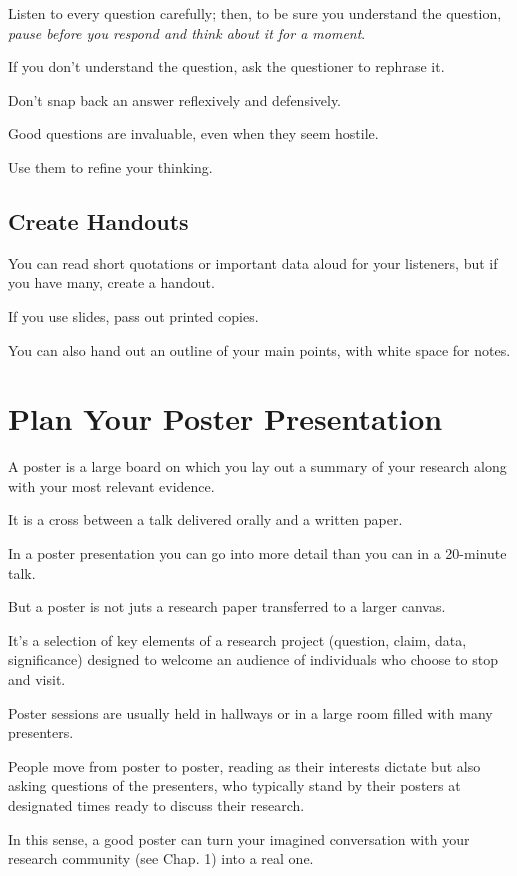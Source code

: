 \documentclass[oneside]{book}
\numberwithin{equation}{section}
\begin{document}
%
Listen to every question carefully; then, to be sure you understand the question, \textit{pause before you respond and think about it for a moment}.

If you don't understand the question, ask the questioner to rephrase it.

Don't snap back an answer reflexively and defensively.

Good questions are invaluable, even when they seem hostile.

Use them to refine your thinking.

\subsection{Create Handouts}
You can read short quotations or important data aloud for your listeners, but if you have many, create a handout.

If you use slides, pass out printed copies.

You can also hand out an outline of your main points, with white space for notes.

\section{Plan Your Poster Presentation}
A poster is a large board on which you lay out a summary of your research along with your most relevant evidence.

It is a cross between a talk delivered orally and a written paper.

In a poster presentation you can go into more detail than you can in a 20-minute talk.

But a poster is not juts a research paper transferred to a larger canvas.

It's a selection of key elements of a research project (question, claim, data, significance) designed to welcome an audience of individuals who choose to stop and visit.

%
Poster sessions are usually held in hallways or in a large room filled with many presenters.

People move from poster to poster, reading as their interests dictate but also asking questions of the presenters, who typically stand by their posters at designated times ready to discuss their research.

In this sense, a good poster can turn your imagined conversation with your research community (see Chap. 1) into a real one.

\end{document}
